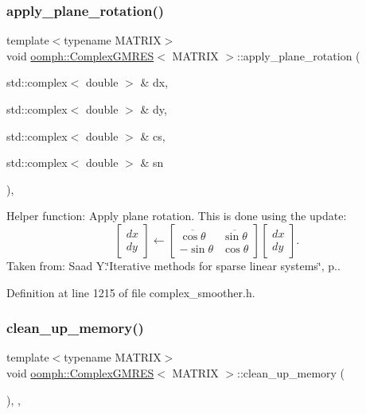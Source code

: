 \subsubsection{\texorpdfstring{apply\+\_\+plane\+\_\+rotation()}{apply\_plane\_rotation()}}
{\footnotesize\ttfamily template$<$typename M\+A\+T\+R\+IX$>$ \\
void \hyperlink{classoomph_1_1ComplexGMRES}{oomph\+::\+Complex\+G\+M\+R\+ES}$<$ M\+A\+T\+R\+IX $>$\+::apply\+\_\+plane\+\_\+rotation (\begin{DoxyParamCaption}\item[{std\+::complex$<$ double $>$ \&}]{dx,  }\item[{std\+::complex$<$ double $>$ \&}]{dy,  }\item[{std\+::complex$<$ double $>$ \&}]{cs,  }\item[{std\+::complex$<$ double $>$ \&}]{sn }\end{DoxyParamCaption})\hspace{0.3cm}{\ttfamily [inline]}, {\ttfamily [private]}}



Helper function\+: Apply plane rotation. This is done using the update\+: \[ \begin{bmatrix} dx \\ dy \end{bmatrix} \leftarrow \begin{bmatrix} \overline{\cos\theta} & \overline{\sin\theta} \\ -\sin\theta & \cos\theta \end{bmatrix} \begin{bmatrix} dx \\ dy \end{bmatrix}. \] Taken from\+: Saad Y.\char`\"{}\+Iterative methods for sparse linear systems\char`\"{}, p.. 



Definition at line 1215 of file complex\+\_\+smoother.\+h.

\mbox{\label{classoomph_1_1ComplexGMRES_a946b88bc1392180c56909b739bfa7b3c}} 
\subsubsection{\texorpdfstring{clean\+\_\+up\+\_\+memory()}{clean\_up\_memory()}}
{\footnotesize\ttfamily template$<$typename M\+A\+T\+R\+IX$>$ \\
void \hyperlink{classoomph_1_1ComplexGMRES}{oomph\+::\+Complex\+G\+M\+R\+ES}$<$ M\+A\+T\+R\+IX $>$\+::clean\+\_\+up\+\_\+memory (\begin{DoxyParamCaption}{ }\end{DoxyParamCaption})\hspace{0.3cm}{\ttfamily [inline]}, {\ttfamily [private]}, {\ttfamily [virtual]}}



